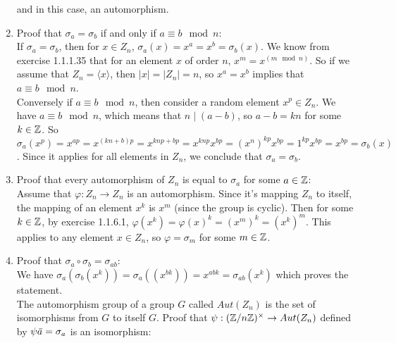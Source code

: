 \documentclass[12pt]{article}
\begin{document}
\begin{enumerate}[label=\textbf{\alph*.}]
            and in this case, an automorphism.
        \item
            Proof that $\sigma_a = \sigma_b$
            if and only if $a \equiv b \mod n$: \\
            If $\sigma_a = \sigma_b$,
            then for $x \in Z_n$,
            $\sigma_a(x) = x^a = x^b = \sigma_b(x)$.
            We know from exercise 1.1.1.35 that for an element $x$ of
            order $n$, $x^m = x^{(m \mod n)}$.
            So if we assume that $Z_n = \langle x \rangle$,
            then $|x| = |Z_n| = n$,
            so $x^a = x^b$
            implies that $a \equiv b \mod n$. \\
            Conversely if $a \equiv b \mod n$,            
            then consider a random element $x^p \in Z_n$.
            We have $a \equiv b \mod n$,
            which means that $n \mid (a - b)$,
            so $a - b = kn$ for some $k \in \mathbb{Z}$.
            So $\sigma_a(x^p) = x^{ap}
            = x^{(kn + b)p}
            = x^{knp + bp}
            = x^{knp}x^{bp}
            = (x^n)^{kp}x^{bp}
            = 1^{kp}x^{bp}
            = x^{bp}
            = \sigma_b(x)$.
            Since it applies for all elements in $Z_n$,
            we conclude that $\sigma_a = \sigma_b$.
        \item
            Proof that every automorphism of $Z_n$ is equal
            to $\sigma_a$ for some $a \in \mathbb{Z}$: \\
            Assume that $\varphi:Z_n \to Z_n$ is an automorphism.
            Since it's mapping $Z_n$ to itself,
            the mapping of an element $x^k$ is $x^m$
            (since the group is cyclic).
            Then for some $k \in \mathbb{Z}$,
            by exercise 1.1.6.1,
            $\varphi(x^k) = \varphi(x)^k = (x^m)^k = (x^k)^m$.
            This applies to any element $x \in Z_n$,
            so $\varphi = \sigma_m$ for some $m \in \mathbb{Z}$. 
        \item
            Proof that $\sigma_a \circ \sigma_b = \sigma_{ab}$: \\
            We have $\sigma_a(\sigma_b(x^k))
            = \sigma_a((x^{bk}))
            = x^{abk}
            = \sigma_{ab}(x^k)$
            which proves the statement. \\
            The automorphism group of a group $G$ called $Aut(Z_n)$
            is the set of isomorphisms from $G$ to itself $G$.
            Proof that $\psi: (\mathbb{Z}/n\mathbb{Z})^\times \to Aut(Z_n)$
            defined by $\psi{\,\overline{\!{a}}} = \sigma_a$ is an isomorphism: \\

\end{enumerate}
\end{document}
